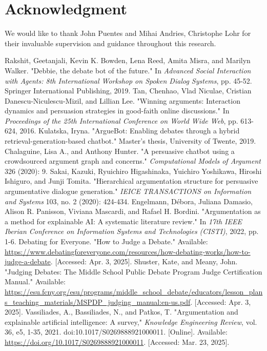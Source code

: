 \documentclass[conference]{IEEEtran}
\begin{document}
\section*{Acknowledgment}
We would like to thank John Puentes and Mihai Andries, Christophe Lohr for their invaluable supervision and guidance throughout this research.

\begin{thebibliography}{00}
     Rakshit, Geetanjali, Kevin K. Bowden, Lena Reed, Amita Misra, and Marilyn Walker. "Debbie, the debate bot of the future." In \textit{Advanced Social Interaction with Agents: 8th International Workshop on Spoken Dialog Systems}, pp. 45-52. Springer International Publishing, 2019.
     Tan, Chenhao, Vlad Niculae, Cristian Danescu-Niculescu-Mizil, and Lillian Lee. "Winning arguments: Interaction dynamics and persuasion strategies in good-faith online discussions." In \textit{Proceedings of the 25th International Conference on World Wide Web}, pp. 613-624, 2016.
     Kulatska, Iryna. "ArgueBot: Enabling debates through a hybrid retrieval-generation-based chatbot." Master's thesis, University of Twente, 2019.
     Chalaguine, Lisa A., and Anthony Hunter. "A persuasive chatbot using a crowdsourced argument graph and concerns." \textit{Computational Models of Argument} 326 (2020): 9.
     Sakai, Kazuki, Ryuichiro Higashinaka, Yuichiro Yoshikawa, Hiroshi Ishiguro, and Junji Tomita. "Hierarchical argumentation structure for persuasive argumentative dialogue generation." \textit{IEICE TRANSACTIONS on Information and Systems} 103, no. 2 (2020): 424-434.
     Engelmann, Débora, Juliana Damasio, Alison R. Panisson, Viviana Mascardi, and Rafael H. Bordini. "Argumentation as a method for explainable AI: A systematic literature review." In \textit{17th IEEE Iberian Conference on Information Systems and Technologies (CISTI)}, 2022, pp. 1-6.
     Debating for Everyone. "How to Judge a Debate." Available: \url{https://www.debatingforeveryone.com/resources/how-debating-works/how-to-judge-a-debate}. [Accessed: Apr. 3, 2025].
     Shuster, Kate, and Meany, John. "Judging Debates: The Middle School Public Debate Program Judge Certification Manual." Available: \url{https://esu.fcny.org/esu/programs/middle_school_debate/educators/lesson_plans_teaching_materials/MSPDP_judging_manual:en-us.pdf}. [Accessed: Apr. 3, 2025].
     Vassiliades, A., Bassiliades, N., and Patkos, T. "Argumentation and explainable artificial intelligence: A survey," \textit{Knowledge Engineering Review}, vol. 36, e5, 1-35, 2021. doi:10.1017/S0269888921000011. [Online]. Available: \url{https://doi.org/10.1017/S0269888921000011}. [Accessed: Mar. 23, 2025].

\end{thebibliography}
\end{document}
